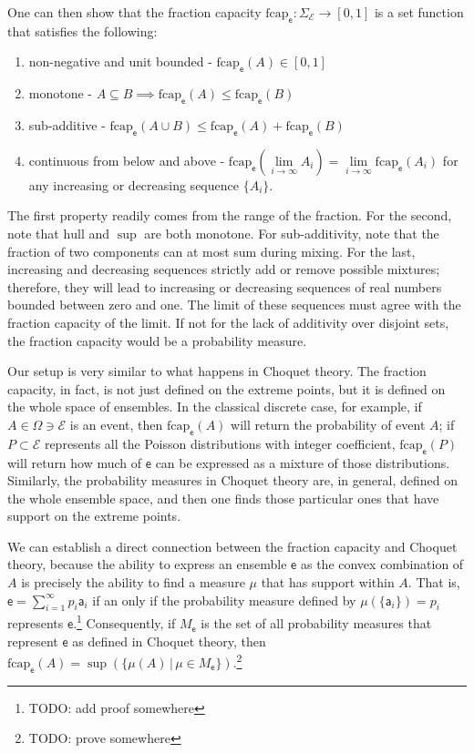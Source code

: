 \documentclass[10pt,twocolumn, nofootinbib]{revtex4-2}
\newcommand\hull{\mathrm{hull}}
\newcommand\frcap{\mathrm{fcap}}
\newcommand{\ens}[1][e] {\mathsf{#1}} %
\newcommand{\Ens}[1][E] {\mathcal{#1}} %
\begin{document}
One can then show that the fraction capacity $\frcap_{\ens} : \Sigma_{\Ens} \to [0,1]$ is a set function that satisfies the following:
\begin{enumerate}
	\item non-negative and unit bounded - $\frcap_{\ens}(A) \in [0,1]$
	\item monotone - $A \subseteq B \implies \frcap_{\ens}(A) \leq \frcap_{\ens}(B)$
	\item sub-additive - $\frcap_{\ens}(A \cup B) \leq \frcap_{\ens}(A) + \frcap_{\ens}(B)$
	\item continuous from below and above - $\frcap_{\ens}(\lim\limits_{i \to \infty} A_i) = \lim\limits_{i \to \infty} \frcap_{\ens}(A_i)$ for any increasing or decreasing sequence $\{A_i\}$.
\end{enumerate}

The first property readily comes from the range of the fraction. For the second, note that $\hull$ and $\sup$ are both monotone. For sub-additivity, note that the fraction of two components can at most sum during mixing. For the last, increasing and decreasing sequences strictly add or remove possible mixtures; therefore, they will lead to increasing or decreasing sequences of real numbers bounded between zero and one. The limit of these sequences must agree with the fraction capacity of the limit. If not for the lack of additivity over disjoint sets, the fraction capacity would be a probability measure.

Our setup is very similar to what happens in Choquet theory. The fraction capacity, in fact, is not just defined on the extreme points, but it is defined on the whole space of ensembles. In the classical discrete case, for example, if $A \in \Omega \ni \Ens$ is an event, then $\frcap_{\ens}(A)$ will return the probability of event $A$; if $P \subset \Ens$ represents all the Poisson distributions with integer coefficient, $\frcap_{\ens}(P)$ will return how much of $\ens$ can be expressed as a mixture of those distributions. Similarly, the probability measures in Choquet theory are, in general, defined on the whole ensemble space, and then one finds those particular ones that have support on the extreme points.

We can establish a direct connection between the fraction capacity and Choquet theory, because the ability to express an ensemble $\ens$ as the convex combination of $A$ is precisely the ability to find a measure $\mu$ that has support within $A$. That is, $\ens = \sum_{i=1}^{\infty} p_i \ens[a]_i$ if an only if the probability measure defined by $\mu(\{\ens[a]_i\}) = p_i$ represents $\ens$.\footnote{TODO: add proof somewhere} Consequently, if $M_{\ens}$ is the set of all probability measures that represent $\ens$ as defined in Choquet theory, then $\frcap_{\ens}(A) = \sup(\{\mu(A) \, | \, \mu \in M_{\ens}\})$.\footnote{TODO: prove somewhere}
\end{document}
